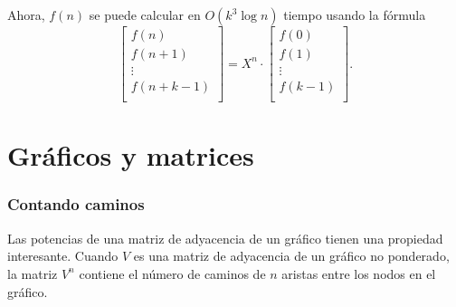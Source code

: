 \begin{samepage}
Ahora, $f(n)$ se puede calcular en
$O(k^3 \log n)$ tiempo usando la fórmula
\[
 \begin{bmatrix}
  f(n) \\
  f(n+1) \\
  \vdots \\
  f(n+k-1) \\
 \end{bmatrix}
=
X^n \cdot
 \begin{bmatrix}
  f(0) \\
  f(1) \\
  \vdots \\
  f(k-1) \\
 \end{bmatrix}.
\]
\end{samepage}

\section{Gráficos y matrices}

\subsubsection{Contando caminos}

Las potencias de una matriz de adyacencia de un gráfico
tienen una propiedad interesante.
Cuando $V$ es una matriz de adyacencia de un gráfico no ponderado,
la matriz $V^n$ contiene el número de caminos de
$n$ aristas entre los nodos en el gráfico.

